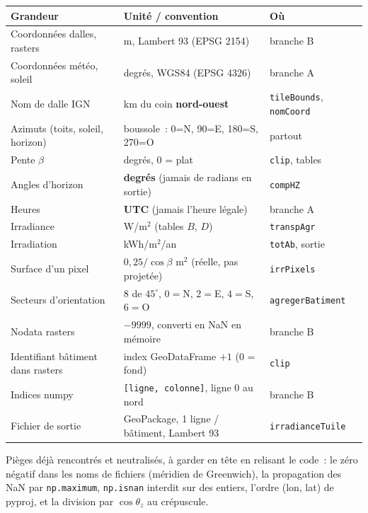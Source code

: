 \documentclass[11pt,a4paper]{article}
\newcommand{\fonction}[1]{\texttt{#1}}
\begin{document}
\begin{center}
\small
\begin{tabular}{@{}l p{6.4cm} l@{}}
\toprule
\textbf{Grandeur} & \textbf{Unité / convention} & \textbf{Où}\\
\midrule
Coordonnées dalles, rasters & m, Lambert 93 (EPSG 2154) & branche B\\
Coordonnées météo, soleil & degrés, WGS84 (EPSG 4326) & branche A\\
Nom de dalle IGN & km du coin \textbf{nord-ouest} & \fonction{tileBounds}, \fonction{nomCoord}\\
Azimuts (toits, soleil, horizon) & boussole~: 0=N, 90=E, 180=S, 270=O & partout\\
Pente $\beta$ & degrés, 0 = plat & \fonction{clip}, tables\\
Angles d'horizon & \textbf{degrés} (jamais de radians en sortie) & \fonction{compHZ}\\
Heures & \textbf{UTC} (jamais l'heure légale) & branche A\\
Irradiance & W/m$^2$ (tables $B$, $D$) & \fonction{transpAgr}\\
Irradiation & kWh/m$^2$/an & \fonction{totAb}, sortie\\
Surface d'un pixel & $0{,}25/\cos\beta$ m$^2$ (réelle, pas projetée) & \fonction{irrPixels}\\
Secteurs d'orientation & 8 de $45^\circ$, $0=$N, $2=$E, $4=$S, $6=$O & \fonction{agregerBatiment}\\
Nodata rasters & $-9999$, converti en NaN en mémoire & branche B\\
Identifiant bâtiment dans rasters & index GeoDataFrame $+ 1$ (0 = fond) & \fonction{clip}\\
Indices numpy & \fonction{[ligne, colonne]}, ligne 0 au nord & branche B\\
Fichier de sortie & GeoPackage, 1 ligne / bâtiment, Lambert 93 & \fonction{irradianceTuile}\\
\bottomrule
\end{tabular}
\end{center}

Pièges déjà rencontrés et neutralisés, à garder en tête en relisant le code~:
le zéro négatif dans les noms de fichiers (méridien de Greenwich), la
propagation des NaN par \fonction{np.maximum}, \fonction{np.isnan} interdit sur
des entiers, l'ordre (lon, lat) de pyproj, et la division par
$\cos\theta_z$ au crépuscule.

\end{document}
